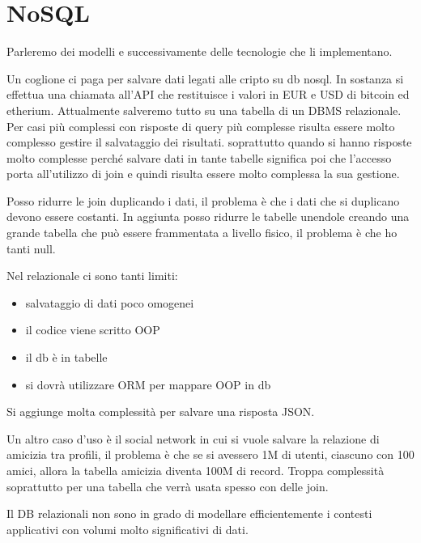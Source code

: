 \chapter{NoSQL}
Parleremo dei modelli e successivamente delle tecnologie che li implementano.

Un coglione ci paga per salvare dati legati alle cripto su db nosql. In sostanza
si effettua una chiamata all'API che restituisce i valori in EUR e USD di bitcoin
ed etherium. Attualmente salveremo tutto su una tabella di un DBMS relazionale.
Per casi più complessi con risposte di query più complesse risulta essere molto
complesso gestire il salvataggio dei risultati. soprattutto quando si hanno risposte
molto complesse perché salvare dati in tante tabelle significa poi che l'accesso
porta all'utilizzo di join e quindi risulta essere molto complessa la sua gestione.

Posso ridurre le join duplicando i dati, il problema è che i dati che si duplicano
devono essere costanti. In aggiunta posso ridurre le tabelle unendole 
creando una grande tabella che può essere frammentata a livello fisico, il problema 
è che ho tanti null.

Nel relazionale ci sono tanti limiti:
\begin{itemize}
    \item salvataggio di dati poco omogenei
    \item il codice viene scritto OOP
    \item il db è in tabelle
    \item si dovrà utilizzare ORM per mappare OOP in db
\end{itemize}

Si aggiunge molta complessità per salvare una risposta JSON.

Un altro caso d'uso è il social network in cui si vuole salvare la relazione di 
amicizia tra profili, il problema è che se si avessero 1M di utenti, ciascuno con 
100 amici, allora la tabella amicizia diventa 100M di record. Troppa complessità
soprattutto per una tabella che verrà usata spesso con delle join.

Il DB relazionali non sono in grado di modellare efficientemente i contesti applicativi
con volumi molto significativi di dati.


